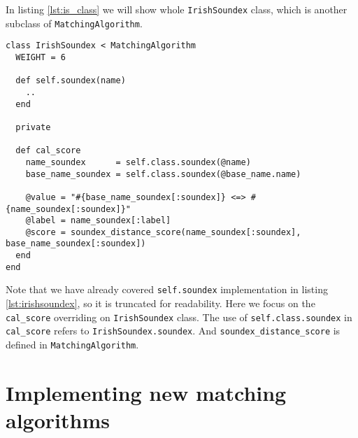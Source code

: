 In listing \ref{lst:is_class} we will show whole \texttt{IrishSoundex} class,
which is another subclass of \texttt{MatchingAlgorithm}.

\begin{minipage}{\linewidth}
  \begin{lstlisting}[label={lst:is_class}, caption={\texttt{IrishSoundex} class.}]
class IrishSoundex < MatchingAlgorithm
  WEIGHT = 6

  def self.soundex(name)
    ..
  end

  private

  def cal_score
    name_soundex      = self.class.soundex(@name)
    base_name_soundex = self.class.soundex(@base_name.name)

    @value = "#{base_name_soundex[:soundex]} <=> #{name_soundex[:soundex]}"
    @label = name_soundex[:label]
    @score = soundex_distance_score(name_soundex[:soundex], base_name_soundex[:soundex])
  end
end
\end{lstlisting}
\end{minipage}

Note that we have already covered \texttt{self.soundex} implementation
in listing \ref{lst:irishsoundex}, so it is truncated for readability.
Here we focus on the \texttt{cal\_score} overriding
on \texttt{IrishSoundex} class. The use of \texttt{self.class.soundex} in \texttt{cal\_score}
refers to \texttt{IrishSoundex.soundex}. And \texttt{soundex\_distance\_score}
is defined in \texttt{MatchingAlgorithm}.


\section{Implementing new matching algorithms}
